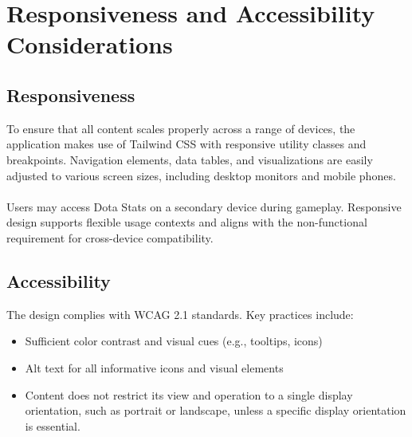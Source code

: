 \section{Responsiveness and Accessibility Considerations}

\subsection{Responsiveness}

To ensure that all content scales properly across a range of devices, the application makes use of Tailwind CSS with responsive utility classes and breakpoints.  Navigation elements, data tables, and visualizations are easily adjusted to various screen sizes, including desktop monitors and mobile phones.
\\
\\
Users may access Dota Stats on a secondary device during gameplay. Responsive design supports flexible usage contexts and aligns with the non-functional requirement for cross-device compatibility.

\subsection{Accessibility}

The design complies with WCAG 2.1 standards. Key practices include:

\begin{itemize}
    \item Sufficient color contrast and visual cues (e.g., tooltips, icons)
    \item Alt text for all informative icons and visual elements
    \item Content does not restrict its view and operation to a single display orientation, such as portrait or landscape, unless a specific display orientation is essential.
\end{itemize}